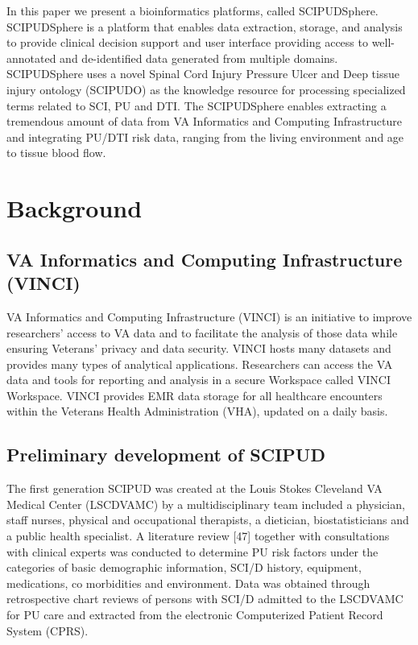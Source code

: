 \documentclass{amia}
\begin{document}
In this paper we present a bioinformatics platforms, called SCIPUDSphere. SCIPUDSphere is a platform that enables data extraction, storage, and analysis to provide clinical decision support and user interface providing access to well-annotated and de-identified data generated from multiple domains. SCIPUDSphere uses a novel Spinal Cord Injury Pressure Ulcer and Deep tissue injury ontology (SCIPUDO) as the knowledge resource for processing specialized terms related to SCI, PU and DTI. The SCIPUDSphere enables extracting a tremendous amount of data from VA Informatics and Computing Infrastructure\cite{VINCI} and integrating PU/DTI risk data, ranging from the living environment and age to tissue blood flow. 

\section{Background}

\subsection{VA Informatics and Computing Infrastructure (VINCI)}
VA Informatics and Computing Infrastructure (VINCI) is an initiative to improve researchers' access to VA data and to facilitate the analysis of those data while ensuring Veterans' privacy and data security. VINCI hosts many datasets and provides many types of analytical applications. Researchers can access the VA data and tools for reporting and analysis in a secure Workspace called VINCI Workspace. VINCI provides EMR data storage for all healthcare encounters within the Veterans Health Administration (VHA), updated on a daily basis. 

\subsection{Preliminary development of SCIPUD}
The first generation SCIPUD was created at the Louis Stokes Cleveland VA Medical Center (LSCDVAMC) by a multidisciplinary team included a physician, staff nurses, physical and occupational therapists, a dietician, biostatisticians and a public health specialist. A literature review [47] together with consultations with clinical experts was conducted to determine PU risk factors under the categories of basic demographic information, SCI/D history, equipment, medications, co morbidities and environment. Data was obtained through retrospective chart reviews of persons with SCI/D admitted to the LSCDVAMC for PU care and extracted from the electronic Computerized Patient Record System (CPRS).
\end{document}
